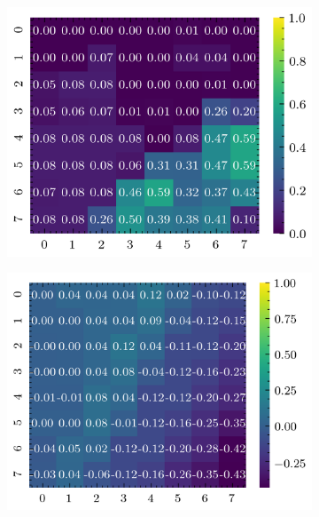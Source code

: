 \documentclass[../document.tex]{subfiles}
\begin{document}
\begin{figure}[H]
    \begin{subfigure}[b]{0.19\textwidth}
        \includegraphics[width=\linewidth]{../img/5/quarry/false_positive/heatmap-2d-0.png}
    \end{subfigure}
    \begin{subfigure}[b]{0.19\textwidth}
        \includegraphics[width=\linewidth]{../img/5/quarry/false_positive/heatmap-2d-1.png}
    \end{subfigure}  
    \begin{subfigure}[b]{0.19\textwidth}

\end{subfigure}
\end{figure}
\end{document}
